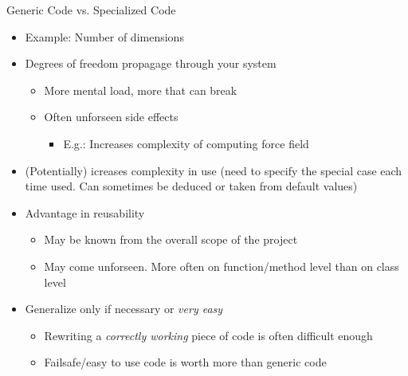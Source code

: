 \begin{frame}{Generic Code vs. Specialized Code}
%
\begin{itemize}
\item Example: Number of dimensions
\item Degrees of freedom propagage through your system
	\begin{itemize}
	\item[\Thus] More mental load, more that can break
	\item Often unforseen side effects
		\begin{itemize}
		\item E.\;g.: Increases complexity of computing force field
		\end{itemize}
	\end{itemize}
\item (Potentially) icreases complexity in use (need to specify the special case each time used. Can sometimes be deduced or taken from default values)
\item Advantage in reusability
	\begin{itemize}
	\item May be known from the overall scope of the project
	\item May come unforseen. More often on function/method level than on class level
	\end{itemize}
\item[\Thus] Generalize only if necessary or \emph{very easy}
	\begin{itemize}
	\item Rewriting a \emph{correctly working} piece of code is often difficult enough
	\item Failsafe/easy to use code is worth more than generic code
	\end{itemize}
\end{itemize}
%
\end{frame}


